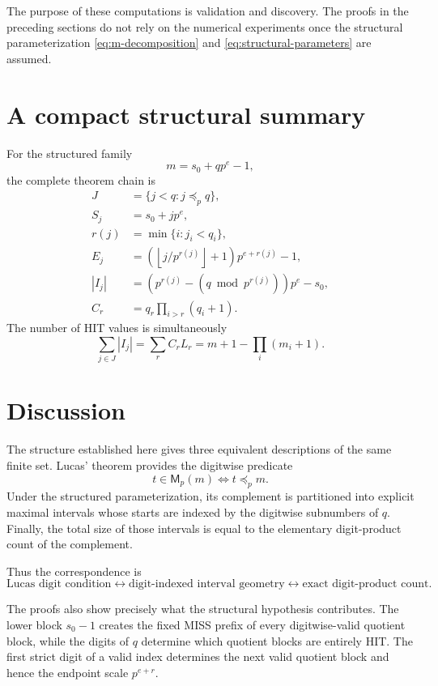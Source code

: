 \documentclass[11pt,a4paper]{article}
\theoremstyle{definition}
\theoremstyle{remark}
\newcommand{\miss}{\mathsf{M}}
\newcommand{\floor}[1]{\left\lfloor #1\right\rfloor}
\begin{document}
The purpose of these computations is validation and discovery.  The proofs in the preceding sections do not rely on the numerical experiments once the structural parameterization \eqref{eq:m-decomposition} and \eqref{eq:structural-parameters} are assumed.

\section{A compact structural summary}

For the structured family
\[
m=s_0+qp^e-1,
\]
the complete theorem chain is
\begin{align}
J&=\{j<q:j\preceq_p q\},\\
S_j&=s_0+jp^e,\\
r(j)&=\min\{i:j_i<q_i\},\\
E_j&=\left(\floor{j/p^{r(j)}}+1\right)p^{e+r(j)}-1,\\
|I_j|&=\left(p^{r(j)}-(q\bmod p^{r(j)})\right)p^e-s_0,\\
C_r&=q_r\prod_{i>r}(q_i+1).
\end{align}
The number of HIT values is simultaneously
\begin{equation}
\boxed{
\sum_{j\in J}|I_j|
=
\sum_rC_rL_r
=
 m+1-\prod_i(m_i+1).
}
\end{equation}

\section{Discussion}

The structure established here gives three equivalent descriptions of the same finite set.  Lucas' theorem provides the digitwise predicate
\[
t\in\miss_p(m)\iff t\preceq_p m.
\]
Under the structured parameterization, its complement is partitioned into explicit maximal intervals whose starts are indexed by the digitwise subnumbers of $q$.  Finally, the total size of those intervals is equal to the elementary digit-product count of the complement.

Thus the correspondence is
\begin{equation}
\text{Lucas digit condition}
\longleftrightarrow
\text{digit-indexed interval geometry}
\longleftrightarrow
\text{exact digit-product count}.
\end{equation}

The proofs also show precisely what the structural hypothesis contributes.  The lower block $s_0-1$ creates the fixed MISS prefix of every digitwise-valid quotient block, while the digits of $q$ determine which quotient blocks are entirely HIT.  The first strict digit of a valid index determines the next valid quotient block and hence the endpoint scale $p^{e+r}$.
\end{document}
